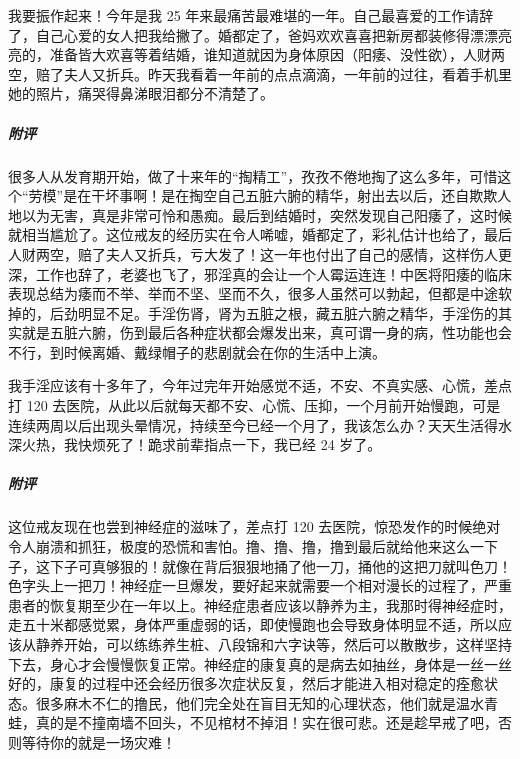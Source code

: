 \begin{case}
    我要振作起来！今年是我 25 年来最痛苦最难堪的一年。自己最喜爱的工作请辞了，自己心爱的女人把我给撇了。婚都定了，爸妈欢欢喜喜把新房都装修得漂漂亮亮的，准备皆大欢喜等着结婚，谁知道就因为身体原因（阳痿、没性欲），人财两空，赔了夫人又折兵。昨天我看着一年前的点点滴滴，一年前的过往，看着手机里她的照片，痛哭得鼻涕眼泪都分不清楚了。
    \subparagraph{附评} 很多人从发育期开始，做了十来年的“掏精工”，孜孜不倦地掏了这么多年，可惜这个“劳模”是在干坏事啊！是在掏空自己五脏六腑的精华，射出去以后，还自欺欺人地以为无害，真是非常可怜和愚痴。最后到结婚时，突然发现自己阳痿了，这时候就相当尴尬了。这位戒友的经历实在令人唏嘘，婚都定了，彩礼估计也给了，最后人财两空，赔了夫人又折兵，亏大发了！这一年也付出了自己的感情，这样伤人更深，工作也辞了，老婆也飞了，邪淫真的会让一个人霉运连连！中医将阳痿的临床表现总结为痿而不举、举而不坚、坚而不久，很多人虽然可以勃起，但都是中途软掉的，后劲明显不足。手淫伤肾，肾为五脏之根，藏五脏六腑之精华，手淫伤的其实就是五脏六腑，伤到最后各种症状都会爆发出来，真可谓一身的病，性功能也会不行，到时候离婚、戴绿帽子的悲剧就会在你的生活中上演。
\end{case}

\begin{case}
    我手淫应该有十多年了，今年过完年开始感觉不适，不安、不真实感、心慌，差点打 120 去医院，从此以后就每天都不安、心慌、压抑，一个月前开始慢跑，可是连续两周以后出现头晕情况，持续至今已经一个月了，我该怎么办？天天生活得水深火热，我快烦死了！跪求前辈指点一下，我已经 24 岁了。
    \subparagraph{附评} 这位戒友现在也尝到神经症的滋味了，差点打 120 去医院，惊恐发作的时候绝对令人崩溃和抓狂，极度的恐慌和害怕。撸、撸、撸，撸到最后就给他来这么一下子，这下子可真够狠的！就像在背后狠狠地捅了他一刀，捅他的这把刀就叫色刀！色字头上一把刀！神经症一旦爆发，要好起来就需要一个相对漫长的过程了，严重患者的恢复期至少在一年以上。神经症患者应该以静养为主，我那时得神经症时，走五十米都感觉累，身体严重虚弱的话，即使慢跑也会导致身体明显不适，所以应该从静养开始，可以练练养生桩、八段锦和六字诀等，然后可以散散步，这样坚持下去，身心才会慢慢恢复正常。神经症的康复真的是病去如抽丝，身体是一丝一丝好的，康复的过程中还会经历很多次症状反复，然后才能进入相对稳定的痊愈状态。很多麻木不仁的撸民，他们完全处在盲目无知的心理状态，他们就是温水青蛙，真的是不撞南墙不回头，不见棺材不掉泪！实在很可悲。还是趁早戒了吧，否则等待你的就是一场灾难！
\end{case}

